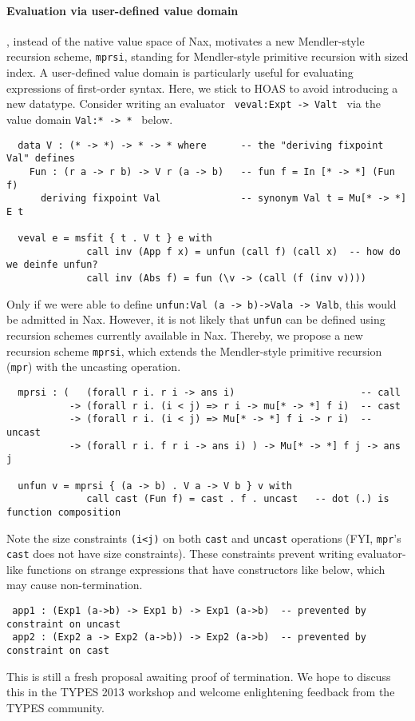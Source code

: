 \documentclass[a4paper]{easychair} %
\newcommand{\mprsi}[0]{\texttt{mprsi}}
\begin{document}
\paragraph{Evaluation via user-defined value domain\!\!\!\!\!}, instead of
the native value space of Nax, motivates a new Mendler-style recursion scheme,
\mprsi, standing for Mendler-style primitive recursion with sized index.
A user-defined value domain is particularly useful for evaluating expressions
of first-order syntax. Here, we stick to HOAS to avoid introducing a new datatype.
Consider writing an evaluator \texttt{\,veval\;:\;Exp\;t\,->\,Val\;t\,}
via the value domain \texttt{Val\;:\;*\,->\,*\,} below.
{\small
\begin{verbatim}
  data V : (* -> *) -> * -> * where      -- the "deriving fixpoint Val" defines
    Fun : (r a -> r b) -> V r (a -> b)   -- fun f = In [* -> *] (Fun f)
      deriving fixpoint Val              -- synonym Val t = Mu[* -> *] E t

  veval e = msfit { t . V t } e with
              call inv (App f x) = unfun (call f) (call x)  -- how do we deinfe unfun?
              call inv (Abs f) = fun (\v -> (call (f (inv v))))
\end{verbatim} }
\noindent
Only if we were able to define
\texttt{unfun\;:\;Val\,(a\,->\,b)\;->\;Val\;a\,->\,Val\;b},
this would be admitted in Nax.
However, it is not likely that \texttt{unfun} can be defined using
recursion schemes currently available in Nax. Thereby, we propose
a new recursion scheme \mprsi, which extends the Mendler-style primitive recursion
(\texttt{mpr}) with the uncasting operation. 
{\small
\begin{verbatim}
  mprsi : (   (forall r i. r i -> ans i)                      -- call
           -> (forall r i. (i < j) => r i -> mu[* -> *] f i)  -- cast   
           -> (forall r i. (i < j) => Mu[* -> *] f i -> r i)  -- uncast 
           -> (forall r i. f r i -> ans i) ) -> Mu[* -> *] f j -> ans j

  unfun v = mprsi { (a -> b) . V a -> V b } v with
              call cast (Fun f) = cast . f . uncast   -- dot (.) is function composition
\end{verbatim} }
\noindent
Note the size constraints \texttt{(i\;<\;j)} on both \texttt{cast} and \texttt{uncast} operations
(FYI, \texttt{mpr}'s \texttt{cast} does not have size constraints).
These constraints prevent writing evaluator-like functions on strange expressions
that have constructors like below, which may cause non-termination.
{\small
\begin{verbatim}
 app1 : (Exp1 (a->b) -> Exp1 b) -> Exp1 (a->b)  -- prevented by constraint on uncast
 app2 : (Exp2 a -> Exp2 (a->b)) -> Exp2 (a->b)  -- prevented by constraint on cast
\end{verbatim} }
\noindent
This is still a fresh proposal awaiting proof of termination.
We hope to discuss this in the TYPES 2013 workshop and welcome
enlightening feedback from the TYPES community.
\end{document}
